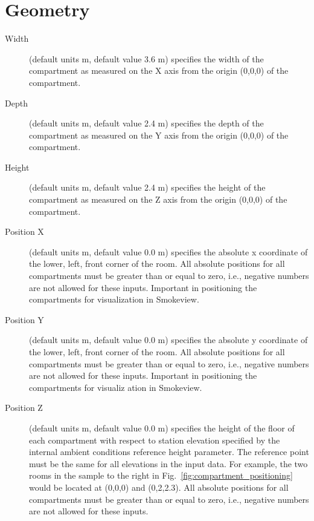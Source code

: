 \section{Geometry}
\label{info:COMP}
\begin{description}
\item[Width] (default units m, default value 3.6 m) specifies the width of the compartment as measured on the X axis from the origin (0,0,0) of the compartment.

\item[Depth]  (default units m, default value 2.4 m) specifies the depth of the compartment as measured on the Y axis from the origin (0,0,0) of the compartment.

\item[Height] (default units m, default value 2.4 m)  specifies the height of the compartment as measured on the Z axis from the origin (0,0,0) of the compartment.

\item[Position X] (default units m, default value 0.0 m)  specifies the absolute x coordinate of the lower, left, front corner of the room. All absolute positions for all compartments must be greater than or equal to zero, i.e., negative numbers are not allowed for these inputs. Important in positioning the compartments for visualization in Smokeview.

\item[Position Y] (default units m, default value 0.0 m)  specifies the absolute y coordinate of the lower, left, front corner of the room. All absolute positions for all compartments must be greater than or equal to zero, i.e., negative numbers are not allowed for these inputs. Important in positioning the compartments for visualiz
ation in Smokeview.

\item[Position Z] (default units m, default value 0.0 m)  specifies the height of the floor of each compartment with respect to station elevation specified by the internal ambient conditions reference height parameter.  The reference point must be the same for all elevations in the input data.  For example, the two rooms in the sample to the right in Fig.~\ref{fig:compartment_positioning} would be located at (0,0,0) and (0,2,2.3). All absolute positions for all compartments must be greater than or equal to zero, i.e., negative numbers are not allowed for these inputs.
\end{description}




